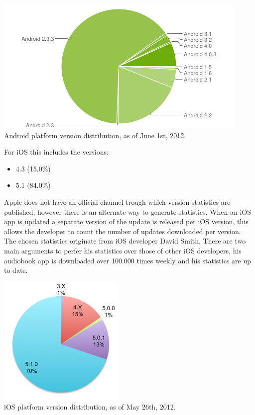 \begin{centering}
\includegraphics[scale=0.25]{images/androidversionchart.png}\\{Android platform version distribution, as of June 1st, 2012.\cite{GoogleAndroid2012}}\\
\end{centering}

\noindent For iOS this includes the versions:
\begin{itemize}
\item 4.3 (15.0\%)
\item 5.1 (84.0\%)
\end{itemize}
Apple does not have an official channel trough which version statistics are published, however there is an alternate way to generate statistics. When an iOS app is updated a separate version of the update is released per iOS version, this allows the developer to count the number of updates downloaded per version. The chosen statistics originate from iOS developer David Smith. There are two main arguments to perfer his statistics over those of other iOS developers, his audiobook app is downloaded over 100.000 times weekly and his statistics are up to date.\cite{Sylvain2012}

\begin{centering}
\includegraphics[scale=0.25]{images/iosversionchart.png}\\{iOS platform version distribution, as of May 26th, 2012.\cite{Sylvain2012}}\\
\end{centering}



